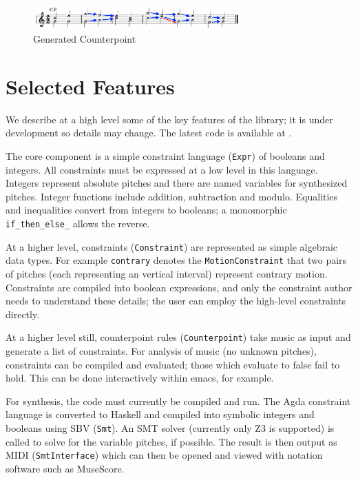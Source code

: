 \documentclass[sigplan,screen]{acmart}
\begin{document}
\begin{figure}
  \includegraphics[width=8cm]{figures/b146gen.png}
  \caption{Generated Counterpoint}
  \label{fig:b146gen3}
\end{figure}


\section{Selected Features}

We describe at a high level some of the key features of the
library; it is under development so details may change. The
latest code is available at \citep{MusicTools}.

The core component is a simple constraint language (\texttt{Expr}) of
booleans and integers. All constraints must be expressed at a low level
in this language. Integers represent absolute pitches and there are
named variables for synthesized pitches. Integer functions include
addition, subtraction and modulo. Equalities and inequalities convert
from integers to booleans; a monomorphic \texttt{if\_then\_else\_} allows
the reverse.

At a higher level, constraints (\texttt{Constraint}) are represented as
simple algebraic data types. For example \texttt{contrary}
denotes the \texttt{MotionConstraint} that two pairs of pitches
(each representing an vertical interval) represent contrary
motion. Constraints are compiled into boolean expressions, and only the
constraint author needs to understand these details; the user can
employ the high-level constraints directly.

At a higher level still, counterpoint rules (\texttt{Counterpoint})
take music as input and generate a list of constraints. For analysis of
music (no unknown pitches), constraints can be compiled and evaluated;
those which evaluate to false fail to hold. This can be done
interactively within emacs, for example.

For synthesis, the code must currently be compiled and run. The Agda
constraint language is converted to Haskell and compiled into symbolic
integers and booleans using SBV (\texttt{Smt}). An SMT solver
(currently only Z3 is supported) is called to solve for the variable
pitches, if possible. The result is then output as MIDI
(\texttt{SmtInterface}) which can then be opened and viewed with
notation software such as MuseScore.
\end{document}
